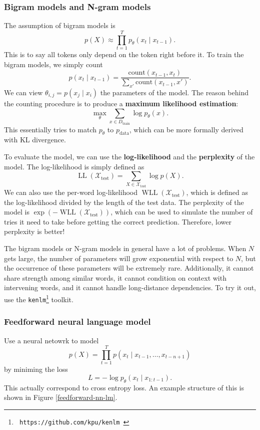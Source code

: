 \documentclass[a4paper]{article}
\begin{document}
\subsubsection{Bigram models and N-gram models} 
The assumption of bigram models is 
\[
p(X) \approx \prod_{t=1}^T p_\theta(x_{t} \mid x_{t - 1}).
\]
This is to say all tokens only depend on the token right 
before it. To train the bigram models, we simply count 
\[
p(x_t \mid x_{t - 1}) = \frac{\text{count} (x_{t-1}, x_t)}
{\sum_{x'} \text{count}(x_{t-1}, x')}.
\]
We can view $\theta_{i, j} = p(x_j \mid x_i)$ the 
parameters of the model. The reason behind the 
counting procedure is to produce a \textbf{maximum 
likelihood estimation}: 
\[
\max_{\theta} \sum_{x \in D_{\text{train}}} 
\log p_\theta(x).
\]
This essentially tries to match $p_\theta$ to $p_{\text{data}}$,
which can be more formally derived with KL divergence.

To evaluate the model, we can use the \textbf{log-likelihood}
and the \textbf{perplexity} of the model. The log-likelihood 
is simply defined as 
\[
  \operatorname{LL}(\mathcal{X}_{\text{test}}) 
  = \sum_{X \in \mathcal{X}_{\text{test}}} \log p(X).
\]
We can also use the per-word log-likelihood 
$\operatorname{WLL}(\mathcal{X}_{\text{test}})$,
which is defined as the log-likelihood divided by the 
length of the test data.
The perplexity of the model is 
$\exp \left( -\operatorname{WLL}(\mathcal{X}_{\text{test}}) \right)$,
which can be used to simulate the number of tries it need to 
take before getting the correct prediction. Therefore, 
lower perplexity is better!

The bigram models or N-gram models in general have a lot of problems.
When $N$ gets large, the number of parameters will grow 
exponential with respect to $N$, but the occurrence of these 
parameters will be extremely rare.
Additionally, it cannot share strength among similar words, 
it cannot condition on context with intervening words, 
and it cannot handle long-distance dependencies. 
To try it out, use the 
\texttt{kenlm}\footnote{\texttt{
  https://github.com/kpu/kenlm
}} toolkit.

\subsubsection{Feedforward neural language model}
Use a neural netowrk to model 
\[
p(X) = \prod_{t = 1}^{T} p(x_t \mid x_{t-1}, \dots, x_{t-n+1})
\]
by miniming the loss 
\[
L = - \log p_\theta (x_t \mid x_{1 : t - 1}).
\]
This actually correspond to cross entropy loss.
An example structure of this is shown in Figure 
\ref{feedforward-nn-lm}.
\end{document}
